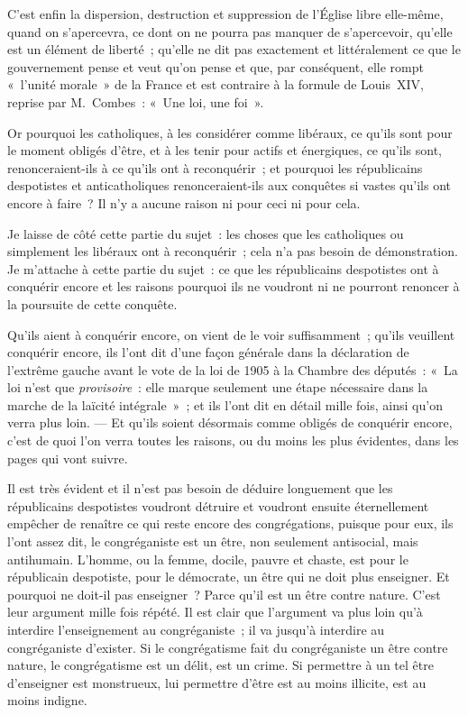 \documentclass[french,twoside]{book} %
\begin{document}
C’est enfin la dispersion, destruction et suppression de l’Église libre elle-même, quand on s’apercevra,  ce dont on ne pourra pas manquer de s’apercevoir, qu’elle est un élément de liberté ; qu’elle ne dit pas exactement et littéralement ce que le gouvernement pense et veut qu’on pense et que, par conséquent, elle rompt « l’unité morale » de la France et est contraire à la formule de Louis XIV, reprise par M. Combes : « Une loi, une foi ».\par
Or pourquoi les catholiques, à les considérer comme libéraux, ce qu’ils sont pour le moment obligés d’être, et à les tenir pour actifs et énergiques, ce qu’ils sont, renonceraient-ils à ce qu’ils ont à reconquérir ; et pourquoi les républicains despotistes et anticatholiques renonceraient-ils aux conquêtes si vastes qu’ils ont encore à faire ? Il n’y a aucune raison ni pour ceci ni pour cela.\par
Je laisse de côté cette partie du sujet : les choses que les catholiques ou simplement les libéraux ont à reconquérir ; cela n’a pas besoin de démonstration. Je m’attache à cette partie du sujet : ce que les républicains despotistes ont à conquérir encore et les raisons pourquoi ils ne voudront ni ne pourront renoncer à la poursuite de cette conquête.\par
Qu’ils aient à conquérir encore, on vient de le voir suffisamment ; qu’ils veuillent conquérir  encore, ils l’ont dit d’une façon générale dans la déclaration de l’extrême gauche avant le vote de la loi de 1905 à la Chambre des députés : « La loi n’est que {\itshape provisoire} : elle marque seulement une étape nécessaire dans la marche de la laïcité intégrale » ; et ils l’ont dit en détail mille fois, ainsi qu’on verra plus loin. — Et qu’ils soient désormais comme obligés de conquérir encore, c’est de quoi l’on verra toutes les raisons, ou du moins les plus évidentes, dans les pages qui vont suivre.\par
Il est très évident et il n’est pas besoin de déduire longuement que les républicains despotistes voudront détruire et voudront ensuite éternellement empêcher de renaître ce qui reste encore des congrégations, puisque pour eux, ils l’ont assez dit, le congréganiste est un être, non seulement antisocial, mais antihumain. L’homme, ou la femme, docile, pauvre et chaste, est pour le républicain despotiste, pour le démocrate, un être qui ne doit plus enseigner. Et pourquoi ne doit-il pas enseigner ? Parce qu’il est un être contre nature. C’est leur argument mille fois répété. Il est clair que l’argument va plus loin qu’à interdire l’enseignement au congréganiste ; il va jusqu’à interdire au congréganiste d’exister. Si le congrégatisme fait du congréganiste un être  contre nature, le congrégatisme est un délit, est un crime. Si permettre à un tel être d’enseigner est monstrueux, lui permettre d’être est au moins illicite, est au moins indigne.\par
\end{document}
